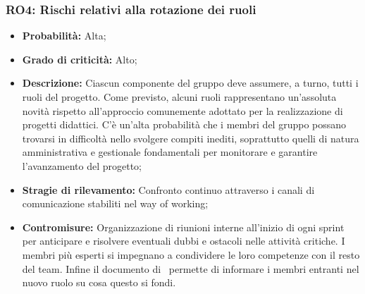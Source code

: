\subsubsection{RO4: Rischi relativi alla rotazione dei ruoli}
\begin{itemize}
    \item \textbf{Probabilità:} Alta;
    \item \textbf{Grado di criticità:} Alto;
    \item \textbf{Descrizione:} Ciascun componente del gruppo deve assumere, a turno, tutti i
    ruoli del progetto. Come previsto, alcuni ruoli rappresentano un’assoluta novità rispetto all’approccio comunemente adottato per la realizzazione di progetti
    didattici. C’è un’alta probabilità che i membri del gruppo possano trovarsi in
    difficoltà nello svolgere compiti inediti, soprattutto quelli di natura amministrativa e gestionale fondamentali per monitorare e garantire l’avanzamento del
    progetto;
    \item \textbf{Stragie di rilevamento:} Confronto continuo attraverso i canali di comunicazione stabiliti nel way of working;
    \item \textbf{Contromisure:} Organizzazione di riunioni interne all’inizio di ogni sprint per
    anticipare e risolvere eventuali dubbi e ostacoli nelle attività critiche. I membri
    più esperti si impegnano a condividere le loro competenze con il resto del team. Infine il documento di \NdP\ permette di informare i membri entranti nel nuovo ruolo su cosa questo si fondi.
\end{itemize}

